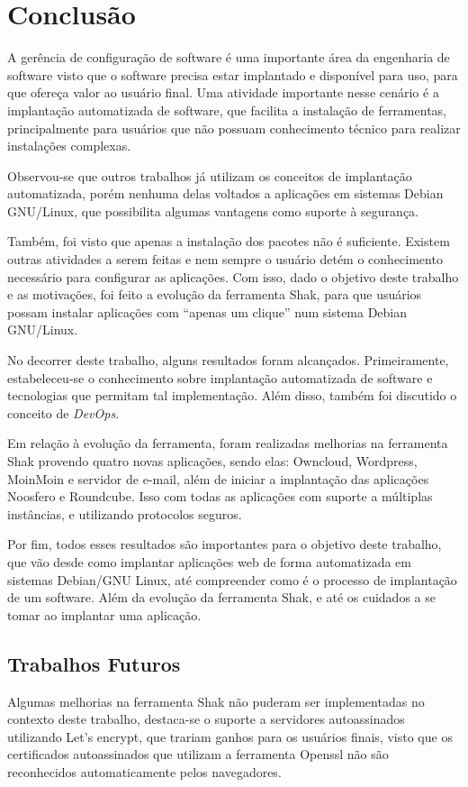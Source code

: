 \chapter{Conclusão}
\label{cap-conclusoes}

A gerência de configuração de software é uma importante área da engenharia de software 
visto que o software precisa estar implantado e disponível para uso, para que ofereça
valor ao usuário final. Uma atividade importante nesse cenário é a implantação
automatizada de software, que facilita a instalação de ferramentas, principalmente
para usuários que não possuam conhecimento técnico para realizar instalações complexas.

Observou-se que outros trabalhos já utilizam os conceitos de implantação automatizada,
porém nenhuma delas voltados a aplicações em sistemas Debian GNU/Linux, que possibilita
algumas vantagens como suporte à segurança.
 
Também, foi visto que apenas a instalação dos pacotes não é suficiente. Existem outras atividades a serem feitas e nem sempre o usuário detém
o conhecimento necessário para configurar as aplicações. Com isso, dado o objetivo
deste trabalho e as motivações, foi feito a evolução da ferramenta Shak, para
que usuários possam instalar aplicações com ``apenas um clique'' num sistema Debian
GNU/Linux.

No decorrer deste trabalho, alguns resultados foram alcançados. Primeiramente,
estabeleceu-se o conhecimento sobre implantação automatizada
de software e tecnologias que permitam tal implementação. Além disso, 
também foi discutido o conceito de \textit{DevOps}. 
 
Em relação à evolução da ferramenta, foram realizadas melhorias na ferramenta Shak
provendo quatro novas aplicações, sendo elas: Owncloud, Wordpress, MoinMoin e
servidor de e-mail, além de iniciar a implantação das aplicações Noosfero e Roundcube. Isso
com todas as aplicações com suporte a múltiplas instâncias, e utilizando protocolos seguros.

Por fim, todos esses resultados são importantes para o objetivo deste trabalho, que vão
desde como implantar aplicações web de forma automatizada em sistemas Debian/GNU Linux, 
até compreender como é o processo de implantação de um software. Além da evolução
da ferramenta Shak, e até os cuidados a se tomar ao implantar uma aplicação.
 
\section{Trabalhos Futuros}
%
Algumas melhorias na ferramenta Shak não puderam ser implementadas no contexto
deste trabalho, destaca-se o suporte a servidores autoassinados utilizando
Let's encrypt, que trariam ganhos para os usuários finais, visto que os certificados
autoassinados que utilizam a ferramenta Openssl não são reconhecidos automaticamente
pelos navegadores. 

